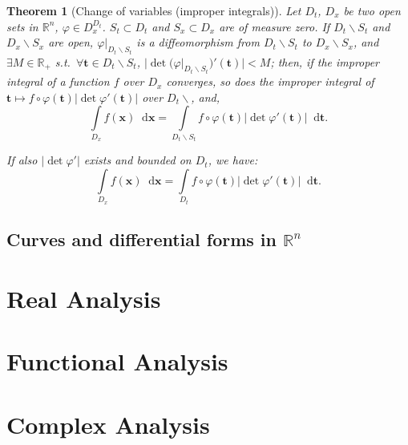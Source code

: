 \documentclass[openany]{book}
\theoremstyle{plain}
\newtheorem{theorem}{Theorem}[section] %
\theoremstyle{definition}
\newcommand{\dif}{\mathop{}\!\mathrm{d}} %
\newcommand*{\bv}{\boldsymbol} %
\begin{document}
\begin{theorem}[Change of variables (improper integrals)]
	Let $D_t$, $D_x$ be two open sets in $\mathbb R^n$, $\varphi \in D_x^{D_t}$. 
	$S_t \subset D_t$ and $S_x \subset D_x$ are of measure zero.
	If $D_t \backslash S_t$ and $D_x \backslash S_x$ are open, $\varphi|_{D_t \backslash S_t}$ is a diffeomorphism from $D_t \backslash S_t$ to $D_x \backslash S_x$, and $\exists M \in \mathbb R_+$ s.t.\ $\forall \bv t \in D_t \backslash S_t$, $|\det (\varphi|_{D_t \backslash S_t})'(\bv t)| < M$; 
	then, if the improper integral of a function $f$ over $D_x$ converges, so does the improper integral of $\bv t \mapsto f \circ \varphi(\bv t) |\det \varphi'(\bv t)|$ over $D_t \backslash$, and, 
	\begin{equation*}
		\int\limits_{D_x} f(\bv x) \dif \bv x = \int\limits_{D_t\backslash S_t} f \circ \varphi(\bv t) |\det \varphi'(\bv t)| \dif \bv t.
	\end{equation*}

	If also $|\det \varphi'|$ exists and bounded on $D_t$, we have:
	\begin{equation*}
		\int\limits_{D_x} f(\bv x) \dif \bv x = \int\limits_{D_t} f \circ \varphi(\bv t) |\det \varphi'(\bv t)| \dif \bv t.
	\end{equation*}
\end{theorem}
\chapter{\texorpdfstring{Curves and differential forms in $\mathbb R^n$}{Curves and differential forms in Rn}}
\part{Real Analysis}


\part{Functional Analysis}
\part{Complex Analysis}


\backmatter{}

\nocite{*} %
\printbibliography[heading=bibliography, title={Bibliography}]

\printindex[symbol]

\printindex
\end{document}
